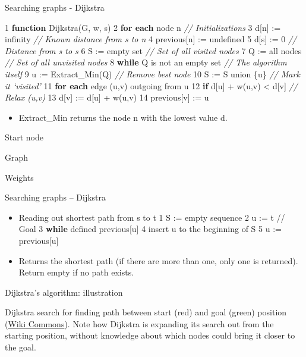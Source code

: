 \documentclass[compress]{beamer}
\begin{document}
\begin{frame}{Searching graphs - Dijkstra}

\begin{block}{1 \textbf{function} Dijkstra(G, w, s) 2 \textbf{for each}
node n \emph{// Initializations} 3 d{[}n{]} := infinity \emph{// Known
distance from s to n} 4 previous{[}n{]} := undefined 5 d{[}s{]} := 0
\emph{// Distance from s to s} 6 S := empty set \emph{// Set of all
visited nodes} 7 Q := all nodes \emph{// Set of all unvisited nodes} 8
\textbf{while} Q is not an empty set \emph{// The algorithm itself} 9 u
:= Extract\_Min(Q) \emph{// Remove best node} 10 S := S union \{u\}
\emph{// Mark it `visited'} 11 \textbf{for each} edge (u,v) outgoing
from u 12 \textbf{if} d{[}u{]} + w(u,v) \textless{} d{[}v{]} \emph{//
Relax (u,v)} 13 d{[}v{]} := d{[}u{]} + w(u,v) 14 previous{[}v{]} := u}

\begin{itemize}
\item Extract\_Min returns the node n with the lowest value d.
\end{itemize}

Start node

Graph

Weights

\end{block}

\end{frame}

\begin{frame}{Searching graphs -- Dijkstra}

\begin{itemize}
\item Reading out shortest path from s to t 1 S := empty sequence 2 u := t
  // Goal 3 \textbf{while} defined previous{[}u{]} 4 insert u to the
  beginning of S 5 u := previous{[}u{]}
\item Returns the shortest path (if there are more than one, only one is
  returned). Return empty if no path exists.
\end{itemize}

\end{frame}

\begin{frame}{Dijkstra's algorithm: illustration}

Dijkstra search for finding path between start (red) and goal (green)
position (\href{http://en.wikipedia.org/wiki/Dijkstra's_algorithm}{Wiki
Commons}). Note how Dijkstra is expanding its search out from the
starting position, without knowledge about which nodes could bring it
closer to the goal.

\end{frame}
\end{document}
